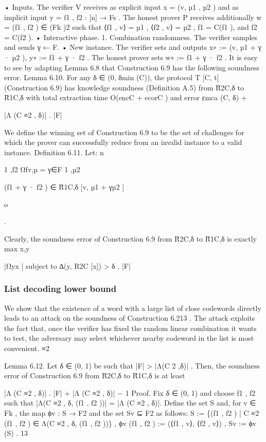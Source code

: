 \documentclass[11pt]{article}
\begin{document}
• Inputs. The verifier V receives as explicit input x = (v, µ1 , µ2 ) and as implicit input y =
f1 , f2 : [n] → Fs . The honest prover P receives additionally w = (f1 , f2 ) ∈ (Fk )2 such that
⟨f1 , v⟩ = µ1 , ⟨f2 , v⟩ = µ2 , f1 = C(f1 ), and f2 = C(f2 ).
• Interactive phase.
1. Combination randomness. The verifier samples and sends γ ← F.
• New instance. The verifier sets and outputs x∗ := (v, µ1 + γ · µ2 ), y∗ := f1 + γ · f2 . The honest
prover sets w∗ := f1 + γ · f2 .
It is easy to see by adapting Lemma 6.8 that Construction 6.9 has the following soundness error.
Lemma 6.10. For any δ ∈ (0, δmin (C)), the protocol T [C, t] (Construction 6.9) has knowledge
soundness (Definition A.5) from R̃2C,δ to R̃1C,δ with total extraction time O(encC + ecorC ) and error
εmca (C, δ) +

|Λ (C ≡2 , δ)|
.
|F|

We define the winning set of Construction 6.9 to be the set of challenges for which the prover
can successfully reduce from an invalid instance to a valid instance.
Definition 6.11. Let:
n

1 ,f2
Ωfv,µ
= γ∈F
1 ,µ2

(f1 + γ · f2 ) ∈ R̃1C,δ [v, µ1 + γµ2 ]

o

.

Clearly, the soundness error of Construction 6.9 from R̃2C,δ to R̃1C,δ is exactly
max
x,y

|Ωyx |
subject to ∆(y, R2C [x]) > δ .
|F|

\subsubsection{List decoding lower bound}


We show that the existence of a word with a large list of close codewords directly leads to an attack
on the soundness of Construction 6.213 . The attack exploits the fact that, once the verifier has
fixed the random linear combination it wants to test, the adversary may select whichever nearby
codeword in the list is most convenient.
≡2

Lemma 6.12. Let δ ∈ (0, 1) be such that |F| > |Λ(C 2 ,δ)| . Then, the soundness error of Construction 6.9 from R̃2C,δ to R̃1C,δ is at least


|Λ (C ≡2 , δ)|
.
|F| + |Λ (C ≡2 , δ)| − 1
Proof. Fix δ ∈ (0, 1) and choose f1 , f2 such that |Λ(C ≡2 , δ, (f1 , f2 ))| = |Λ (C ≡2 , δ)|. Define the set
S and, for v ∈ Fk , the map ϕv : S → F2 and the set Sv ⊆ F2 as follows:
S := \{(f1 , f2 ) | C ≡2 (f1 , f2 ) ∈ Λ(C ≡2 , δ, (f1 , f2 ))\} ,
ϕv (f1 , f2 ) := (⟨f1 , v⟩, ⟨f2 , v⟩) , Sv := ϕv (S) .
13
\end{document}
